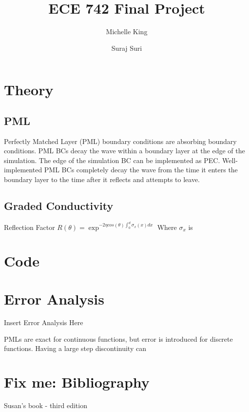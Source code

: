 \documentclass{article}
\title{ECE 742 Final Project}
\author{
  Michelle King
  \and
  Suraj Suri
  }
\begin{document}
\maketitle
\section{Theory}
\subsection{PML}
Perfectly Matched Layer (PML) boundary conditions are absorbing boundary
conditions. PML BCs decay the wave within a boundary layer at the edge of the
simulation. The edge of the simulation BC can be implemented as PEC.
Well-implemented PML BCs completely decay the wave from the time it enters the
boundary layer to the time after it reflects and attempts to leave.

\subsection{Graded Conductivity}

Reflection Factor
$R(\theta)=\exp^{-2\eta cos(\theta)\int_{0}^{d}\sigma_{x}(x)dx}$
Where $\sigma_{x}$ is 

\section{Code}


\section{Error Analysis}
Insert Error Analysis Here

PMLs are exact for continuous functions, but error is introduced for discrete functions. Having a large step discontinuity can 

\section{Fix me: Bibliography}
Susan's book - third edition
\end{document}
